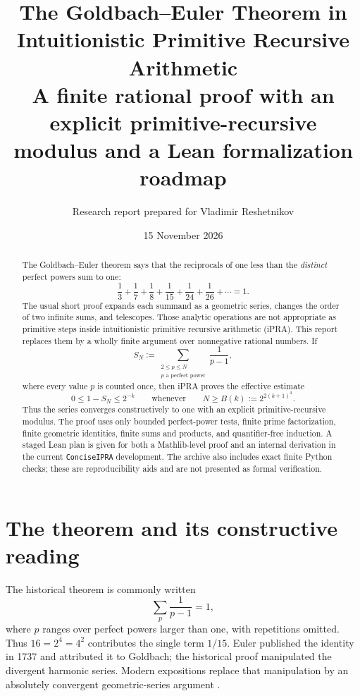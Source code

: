 \documentclass[11pt]{article}
\title{\textbf{The Goldbach--Euler Theorem in Intuitionistic Primitive Recursive Arithmetic}\\[4pt]
\large A finite rational proof with an explicit primitive-recursive modulus and a Lean formalization roadmap}
\author{Research report prepared for Vladimir Reshetnikov}
\date{15 November 2026}
\theoremstyle{definition}
\begin{document}
\maketitle

\begin{abstract}
The Goldbach--Euler theorem says that the reciprocals of one less than the
\emph{distinct} perfect powers sum to one:
\[
  \frac13+\frac17+\frac18+\frac1{15}+\frac1{24}+\frac1{26}+\cdots=1.
\]
The usual short proof expands each summand as a geometric series, changes the
order of two infinite sums, and telescopes.  Those analytic operations are not
appropriate as primitive steps inside intuitionistic primitive recursive
arithmetic (iPRA).  This report replaces them by a wholly finite argument over
nonnegative rational numbers.  If
\[
 S_N:=\sum_{\substack{2\le p\le N\\ p\text{ a perfect power}}}\frac1{p-1},
\]
where every value $p$ is counted once, then iPRA proves the effective estimate
\[
  0\le 1-S_N\le 2^{-k}
  \qquad\text{whenever}\qquad
  N\ge B(k):=2^{2(k+1)^2}.
\]
Thus the series converges constructively to one with an explicit
primitive-recursive modulus.  The proof uses only bounded perfect-power tests,
finite prime factorization, finite geometric identities, finite sums and
products, and quantifier-free induction.  A staged Lean plan is given for both
a Mathlib-level proof and an internal derivation in the current
\texttt{ConciseIPRA} development.  The archive also includes exact finite
Python checks; these are reproducibility aids and are not presented as formal
verification.
\end{abstract}

\tableofcontents

\section{The theorem and its constructive reading}

The historical theorem is commonly written
\begin{equation}\label{eq:classical-ge}
  \sum_{p}\frac1{p-1}=1,
\end{equation}
where $p$ ranges over perfect powers larger than one, with repetitions omitted.
Thus $16=2^4=4^2$ contributes the single term $1/15$.  Euler published the
identity in 1737 and attributed it to Goldbach; the historical proof manipulated
the divergent harmonic series.  Modern expositions replace that manipulation
by an absolutely convergent geometric-series argument
\cite{viader2006,zeilberger2006}.
\end{document}
